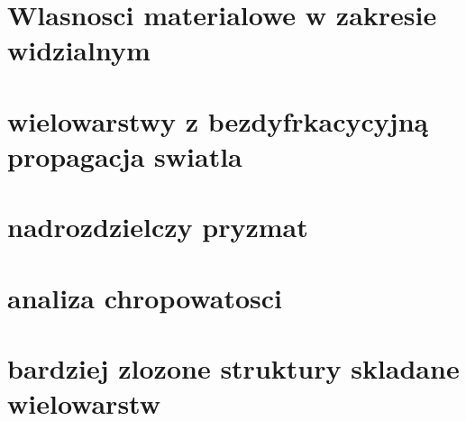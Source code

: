 
\section{Wlasnosci materialowe w zakresie widzialnym}

\section{wielowarstwy z bezdyfrkacycyjną propagacja swiatla}
\section{nadrozdzielczy pryzmat}
\section{analiza chropowatosci}
\section{bardziej zlozone struktury skladane wielowarstw}





